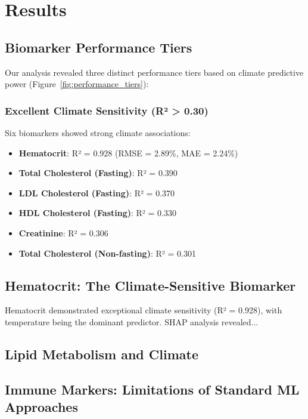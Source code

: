 \documentclass[11pt,a4paper]{article}
\begin{document}
\section{Results}

\subsection{Biomarker Performance Tiers}

Our analysis revealed three distinct performance tiers based on climate predictive power (Figure~\ref{fig:performance_tiers}):

\subsubsection{Excellent Climate Sensitivity (R² > 0.30)}
Six biomarkers showed strong climate associations:
\begin{itemize}
    \item \textbf{Hematocrit}: R² = 0.928 (RMSE = 2.89\%, MAE = 2.24\%)
    \item \textbf{Total Cholesterol (Fasting)}: R² = 0.390
    \item \textbf{LDL Cholesterol (Fasting)}: R² = 0.370
    \item \textbf{HDL Cholesterol (Fasting)}: R² = 0.330
    \item \textbf{Creatinine}: R² = 0.306
    \item \textbf{Total Cholesterol (Non-fasting)}: R² = 0.301
\end{itemize}


\subsection{Hematocrit: The Climate-Sensitive Biomarker}

Hematocrit demonstrated exceptional climate sensitivity (R² = 0.928), with temperature being the dominant predictor. SHAP analysis revealed...

\subsection{Lipid Metabolism and Climate}


\subsection{Immune Markers: Limitations of Standard ML Approaches}
\end{document}
